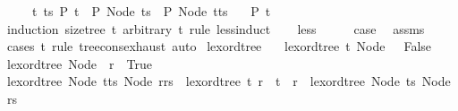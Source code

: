 \begin{isabellebody}
\ \ \ \ \ {\isachardoublequoteopen}{\isasymAnd}t\ ts{\isachardot}{\kern0pt}\ P\ t\ {\isasymLongrightarrow}\ P\ {\isacharparenleft}{\kern0pt}Node\ ts{\isacharparenright}{\kern0pt}\ {\isasymLongrightarrow}\ P\ {\isacharparenleft}{\kern0pt}Node\ {\isacharparenleft}{\kern0pt}t{\isacharhash}{\kern0pt}ts{\isacharparenright}{\kern0pt}{\isacharparenright}{\kern0pt}{\isachardoublequoteclose}\isanewline
\ \ \ {\isachardoublequoteopen}P\ t{\isachardoublequoteclose}\isanewline
%
\isadelimproof
%
\endisadelimproof
%
\isatagproof
{}\isamarkupfalse%
\ {\isacharparenleft}{\kern0pt}induction\ {\isachardoublequoteopen}size{\isacharunderscore}{\kern0pt}tree\ t{\isachardoublequoteclose}\ arbitrary{\isacharcolon}{\kern0pt}\ t\ rule{\isacharcolon}{\kern0pt}\ less{\isacharunderscore}{\kern0pt}induct{\isacharparenright}{\kern0pt}\isanewline
\ \ \isamarkupfalse%
\ less\isanewline
\ \ \isamarkupfalse%
\ \isamarkupfalse%
\ {\isacharquery}{\kern0pt}case\ \isamarkupfalse%
\ assms\ \isamarkupfalse%
\ {\isacharparenleft}{\kern0pt}cases\ t\ rule{\isacharcolon}{\kern0pt}\ tree{\isacharunderscore}{\kern0pt}cons{\isacharunderscore}{\kern0pt}exhaust{\isacharparenright}{\kern0pt}\ auto\isanewline
{}\isamarkupfalse%
%
\endisatagproof
{\isafoldproof}%
%
\isadelimproof
\isanewline
%
\endisadelimproof
\isanewline
{}\isamarkupfalse%
\ lexord{\isacharunderscore}{\kern0pt}tree\ \isanewline
\ \ {\isachardoublequoteopen}lexord{\isacharunderscore}{\kern0pt}tree\ t\ {\isacharparenleft}{\kern0pt}Node\ {\isacharbrackleft}{\kern0pt}{\isacharbrackright}{\kern0pt}{\isacharparenright}{\kern0pt}\ {\isasymlongleftrightarrow}\ False{\isachardoublequoteclose}\isanewline
{\isacharbar}{\kern0pt}\ {\isachardoublequoteopen}lexord{\isacharunderscore}{\kern0pt}tree\ {\isacharparenleft}{\kern0pt}Node\ {\isacharbrackleft}{\kern0pt}{\isacharbrackright}{\kern0pt}{\isacharparenright}{\kern0pt}\ r\ {\isasymlongleftrightarrow}\ True{\isachardoublequoteclose}\isanewline
{\isacharbar}{\kern0pt}\ {\isachardoublequoteopen}lexord{\isacharunderscore}{\kern0pt}tree\ {\isacharparenleft}{\kern0pt}Node\ {\isacharparenleft}{\kern0pt}t{\isacharhash}{\kern0pt}ts{\isacharparenright}{\kern0pt}{\isacharparenright}{\kern0pt}\ {\isacharparenleft}{\kern0pt}Node\ {\isacharparenleft}{\kern0pt}r{\isacharhash}{\kern0pt}rs{\isacharparenright}{\kern0pt}{\isacharparenright}{\kern0pt}\ {\isasymlongleftrightarrow}\ lexord{\isacharunderscore}{\kern0pt}tree\ t\ r\ {\isasymor}\ {\isacharparenleft}{\kern0pt}t\ {\isacharequal}{\kern0pt}\ r\ {\isasymand}\ lexord{\isacharunderscore}{\kern0pt}tree\ {\isacharparenleft}{\kern0pt}Node\ ts{\isacharparenright}{\kern0pt}\ {\isacharparenleft}{\kern0pt}Node\ rs{\isacharparenright}{\kern0pt}{\isacharparenright}{\kern0pt}{\isachardoublequoteclose}\isanewline

\end{isabellebody}

